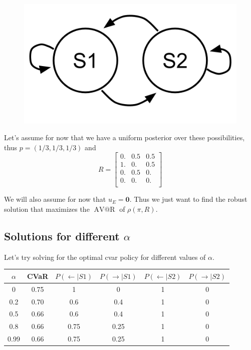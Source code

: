 \documentclass{article}
\makeatletter
\DeclareMathOperator{\avar}{AV@R}
\newcommand{\zero}{\mathbf{0}}
\makeatother
\begin{document}
\begin{figure}
\centering
\includegraphics[scale=0.2]{./figs/chain_twostate.png}
\caption{}
\label{fig:two_state_mdp}
\end{figure}

Let's assume for now that we have a uniform posterior over these possibilities, thus $p= (1/3, 1/3, 1/3)$ and 
\begin{equation}
R = \begin{bmatrix}
0. &  0.5 & 0.5 \\
 1. & 0. & 0.5 \\
 0. & 0.5 & 0.  \\
 0. &  0. & 0. \\
\end{bmatrix}
\end{equation}

We will also assume for now that $u_E = \zero$. Thus we just want to find the robust solution that maximizes the $\avar$ of $\rho(\pi, R)$.

\subsection{Solutions for different $\alpha$}
Let's try solving for the optimal cvar policy for different values of $\alpha$. 

\begin{center}
\begin{tabular}{cccccc}
\hline 
$\alpha$ & CVaR & $P(\leftarrow \mid S1)$ & $P(\rightarrow \mid S1)$ & $P(\leftarrow \mid S2)$ & $P(\rightarrow \mid S2)$ \\ 
\hline 
0 & 0.75 & 1 & 0 & 1 & 0 \\
0.2& 0.70 & 0.6 & 0.4 & 1 & 0 \\
 0.5& 0.66 & 0.6 & 0.4 & 1 & 0 \\
 0.8& 0.66 & 0.75 &  0.25 & 1 & 0 \\
  0.99& 0.66 & 0.75 & 0.25 & 1 & 0 \\
\hline 
\end{tabular} 
\end{center}
\end{document}
